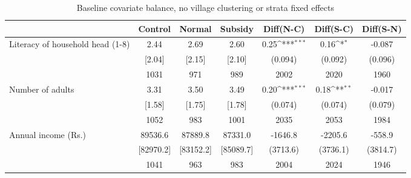 \begin{table}[htbp]\centering
\def\sym#1{\ifmmode^{#1}\else\(^{#1}\)\fi}
\caption{Baseline covariate balance, no village clustering or strata fixed effects \label{tab:"balance"}}
\begin{tabular*}{1\hsize}{@{\hskip\tabcolsep\extracolsep\fill}l*{1}{cccccc}}
\toprule
                                &  Control&   Normal&  Subsidy&Diff(N-C)         &Diff(S-C)         &Diff(S-N)         \\
\midrule
Literacy of household head (1-8)&     2.44&     2.69&     2.60&     0.25\sym{***}&     0.16\sym{*}  &   -0.087         \\
                                &   [2.04]&   [2.15]&   [2.10]&  (0.094)         &  (0.092)         &  (0.096)         \\
                                &     1031&      971&      989&     2002         &     2020         &     1960         \\
Number of adults                &     3.31&     3.50&     3.49&     0.20\sym{***}&     0.18\sym{**} &   -0.017         \\
                                &   [1.58]&   [1.75]&   [1.78]&  (0.074)         &  (0.074)         &  (0.079)         \\
                                &     1052&      983&     1001&     2035         &     2053         &     1984         \\
Annual income (Rs.)             &  89536.6&  87889.8&  87331.0&  -1646.8         &  -2205.6         &   -558.9         \\
                                &[82970.2]&[83152.2]&[85089.7]& (3713.6)         & (3736.1)         & (3814.7)         \\
                                &     1041&      963&      983&     2004         &     2024         &     1946         \\


\end{tabular*}
\end{table}
